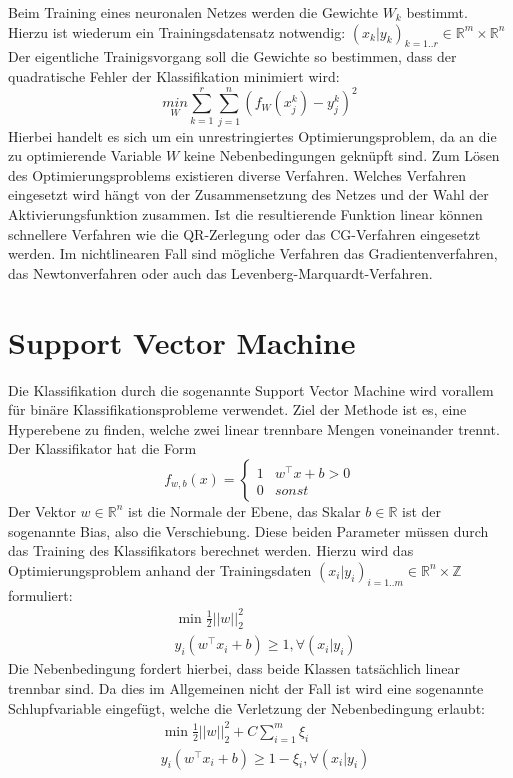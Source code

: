 Beim Training eines neuronalen Netzes werden die Gewichte \(W_k\) bestimmt. Hierzu ist wiederum ein Trainingsdatensatz notwendig: 
 \( (x_k | y_k)_{k=1..r} \in \mathbb{R}^m \times \mathbb{R}^n \)
Der eigentliche Trainigsvorgang soll die Gewichte so bestimmen, dass der quadratische Fehler der Klassifikation minimiert wird:
\begin{equation}
 \underset{W}{min} \sum_{k=1}^r \sum_{j=1}^n (f_W(x_j^k)-y_j^k)^2
\end{equation}
Hierbei handelt es sich um ein unrestringiertes Optimierungsproblem, da an die zu optimierende Variable \(W\) keine Nebenbedingungen gekn\"upft sind. Zum L\"osen des Optimierungsproblems existieren diverse Verfahren. Welches Verfahren eingesetzt wird h\"angt von der Zusammensetzung des Netzes und der Wahl der Aktivierungsfunktion zusammen. Ist die resultierende Funktion linear k\"onnen schnellere Verfahren wie die QR-Zerlegung oder das CG-Verfahren eingesetzt werden. Im nichtlinearen Fall sind m\"ogliche Verfahren das Gradientenverfahren, das Newtonverfahren oder auch das Levenberg-Marquardt-Verfahren.

\section{Support Vector Machine}
Die Klassifikation durch die sogenannte Support Vector Machine wird vorallem f\"ur bin\"are Klassifikationsprobleme verwendet. Ziel der Methode ist es, eine Hyperebene zu finden, welche zwei linear trennbare Mengen voneinander trennt. Der Klassifikator hat die Form
\begin{equation*}
 f_{w, b}(x) = 
 \begin{cases}
  1 & w^\intercal x+b>0 \\
  0 & sonst
 \end{cases}
\end{equation*}
 Der Vektor \(w \in \mathbb{R}^n \) ist die Normale der Ebene, das Skalar \(b \in \mathbb{R}\) ist der sogenannte Bias, also die Verschiebung. Diese beiden Parameter m\"ussen durch das Training des Klassifikators berechnet werden. Hierzu wird das Optimierungsproblem anhand der Trainingsdaten \( (x_i | y_i)_{i=1..m} \in \mathbb{R}^n \times \mathbb{Z} \) formuliert:
\begin{eqnarray*}
 & \min \frac{1}{2}||w||_2^2 \\
 & y_i(w^\intercal x_i+b) \geq 1, \forall (x_i | y_i)
\end{eqnarray*}
Die Nebenbedingung fordert hierbei, dass beide Klassen tats\"achlich linear trennbar sind. Da dies im Allgemeinen nicht der Fall ist wird eine sogenannte Schlupfvariable eingef\"ugt, welche die Verletzung der Nebenbedingung erlaubt:
\begin{eqnarray*}
 &\min \frac{1}{2}||w||_2^2+C \sum_{i=1}^m \xi_i \\
 &y_i(w^\intercal x_i+b) \geq 1-\xi_i, \forall (x_i | y_i)
\end{eqnarray*}

